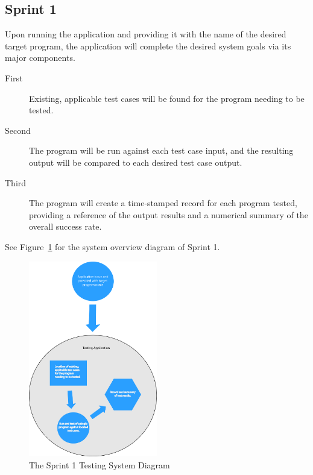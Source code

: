 \subsection{Sprint 1}
Upon running the application and providing it with the name of the desired target program, the application
will complete the desired system goals via its major components.
\begin{description}
\item[First      ]Existing, applicable test cases will be found for the program needing to be tested. 
\item[Second]The program will be run against each test case input, and the resulting output will be 
compared to each desired test case output.
\item[Third   ]The program will create a time-stamped record for each program tested, providing a reference of 
the output results and a numerical summary of the overall success rate.
\end{description}  
See Figure~\ref{systemdiagram} for the system overview diagram of Sprint 1.
\begin{figure}[H]
\begin{center}
\includegraphics[width=0.5\textwidth]{./diagram}
\end{center}
\caption{The Sprint 1 Testing System Diagram \label{systemdiagram}}
\end{figure}

